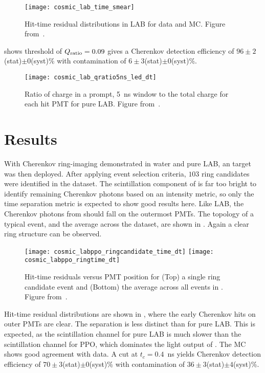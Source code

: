 \begin{figure}
	\centering
	\texttt{[image: cosmic\_lab\_time\_smear]}
	\caption{Hit-time residual distributions in LAB for data and MC. Figure from~\cite{chess_lab}.}
	\label{fig:lab}
\end{figure}

 shows threshold of $Q_{\rm ratio}=0.09$ gives a Cherenkov detection efficiency of $96\pm2$(stat)$\pm0$(syst)\% with contamination of $6\pm3$(stat)$\pm0$(syst)\%.

\begin{figure}
	\centering
	\texttt{[image: cosmic\_lab\_qratio5ns\_led\_dt]}
	\caption{Ratio of charge in a prompt, 5~ns window to the total charge for each hit PMT  for pure LAB. Figure from~\cite{chess_lab}.}
	\label{f:labQ}
\end{figure}

\clearpage

\section{\texorpdfstring{\labppo}{LAB+PPO} Results}
\label{sec:labppo}

With Cherenkov ring-imaging demonstrated in water and pure LAB, an {\labppo} target was then deployed.
After applying event selection criteria, $103$ ring candidates were identified in the {\labppo} dataset. 
The scintillation component of {\labppo} is far too bright to identify remaining Cherenkov photons based on an intensity metric, so only the time separation metric is expected to show good results here.
Like LAB, the Cherenkov photons from {\labppo} should fall on the outermost PMTs.
The topology of a typical event, and the average across the dataset, are shown in .  Again a clear ring structure can be observed. 
\begin{figure}
	\centering
	\texttt{[image: cosmic\_labppo\_ringcandidate\_time\_dt]}
	\texttt{[image: cosmic\_labppo\_ringtime\_dt]}	
	\caption{Hit-time residuals versus PMT position for (Top) a single ring candidate event and (Bottom) the average across all events in {\labppo}. Figure from~\cite{chess_lab}.}
	\label{fig:labppo_ring}
\end{figure}
Hit-time residual distributions are shown in , where the early Cherenkov hits on outer PMTs are clear. 
The separation is less distinct than for pure LAB.
This is expected, as the scintillation channel for pure LAB is much slower than the scintillation channel for PPO, which dominates the light output of {\labppo}.
The MC shows good agreement with data.  
A cut at $ t_c = 0.4$~ns yields Cherenkov detection efficiency of $70 \pm 3 $(stat)$\pm0$(syst)\% with contamination of $36 \pm 3 $(stat)$\pm4$(syst)\%. 

